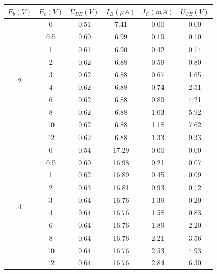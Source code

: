 \documentclass[10pt, a4paper]{article} %
\begin{document}
\begin{table}[ht]
    \centering
    \label{tab:c}
    \begin{tabular}{|c|c|c|c|c|c|}
        \hline
        $E_b(V)$&$E_c(V)$&$U_{BE}(V)$&$I_B(\mu  A)$&$I_C(mA)$&$U_{CE}(V)$\\ \hline
        \multirow{10}{*}{2} &0  &0.51&7.41&0.00&0.00\\ \cline{2-6}
                            &0.5&0.60&6.99&0.19&0.10\\ \cline{2-6}
                            &1  &0.61&6.90&0.42&0.14\\ \cline{2-6}
                            &2  &0.62&6.88&0.59&0.80\\ \cline{2-6}
                            &3  &0.62&6.88&0.67&1.65\\ \cline{2-6}
                            &4  &0.62&6.88&0.74&2.51\\ \cline{2-6}
                            &6  &0.62&6.88&0.89&4.21\\ \cline{2-6}
                            &8  &0.62&6.88&1.03&5.92\\ \cline{2-6}
                            &10 &0.62&6.88&1.18&7.62\\ \cline{2-6}
                            &12 &0.62&6.88&1.33&9.33\\ \hline
        \multirow{10}{*}{4} &0  &0.54&17.29&0.00&0.00\\ \cline{2-6}
                            &0.5&0.60&16.98&0.21&0.07\\ \cline{2-6}
                            &1  &0.62&16.89&0.45&0.09\\ \cline{2-6}
                            &2  &0.63&16.81&0.93&0.12\\ \cline{2-6}
                            &3  &0.64&16.76&1.39&0.20\\ \cline{2-6}
                            &4  &0.64&16.76&1.58&0.83\\ \cline{2-6}
                            &6  &0.64&16.76&1.89&2.20\\ \cline{2-6}
                            &8  &0.64&16.76&2.21&3.56\\ \cline{2-6}
                            &10 &0.64&16.76&2.53&4.93\\ \cline{2-6}
                            &12 &0.64&16.76&2.84&6.30\\ \hline
                    
    \end{tabular}
\end{table}
\end{document}
